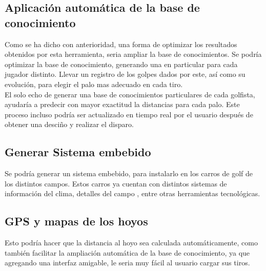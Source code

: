 \documentclass[runningheads,a4paper]{llncs}
\begin{document}
\subsection{Aplicación automática de la base de conocimiento}

  Como se ha dicho con anterioridad, una forma de optimizar los resultados
  obtenidos por esta herramienta, seria ampliar la base de conocimientos. Se
  podría optimizar la base de conocimiento, generando una en particular para cada
  jugador distinto. Llevar un registro de los golpes dados por este, así como su
  evolución, para elegir el palo mas adecuado en cada tiro.\\ El solo echo de
  generar una base de conocimientos particulares de cada golfista, ayudaría a
  predecir con mayor exactitud la distancias para cada palo. Este proceso incluso
  podría ser actualizado en tiempo real por el usuario después de obtener una
  desciño y realizar el disparo.\\

\subsection{Generar Sistema embebido}

  Se podría generar un sistema embebido, para instalarlo en los carros de golf de
  los distintos campos. Estos carros ya cuentan con distintos sistemas de
  información del clima, detalles del campo , entre otras herramientas
  tecnológicas. 

\subsection{GPS y mapas de los hoyos}

  Esto podría hacer que la distancia al hoyo sea calculada automáticamente, como
  también facilitar la ampliación automática de la base de conocimiento, ya que
  agregando una interfaz amigable, le seria muy fácil al usuario cargar sus
  tiros.
\end{document}
